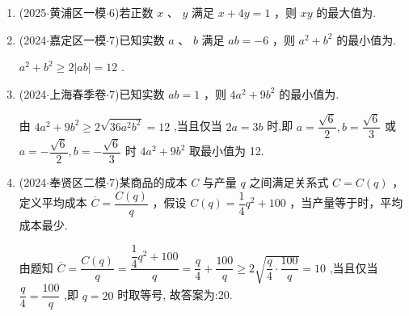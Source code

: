 \begin{enumerate}
    \item (2025$\cdot$黄浦区一模$\cdot$6)若正数 $x$ 、 $y$ 满足 $x + {4y} = 1$ ，则 ${xy}$ 的最大值为.
    \begin{jieda}
    \end{jieda}

    \item (2024$\cdot$嘉定区一模$\cdot$7)已知实数 $a$ 、 $b$ 满足 ${ab} =  - 6$ ，则 ${a}^{2} + {b}^{2}$ 的最小值为.
    \begin{jieda}
        ${a}^{2} + {b}^{2} \geq  2\left| {ab}\right|  = {12}$ .
    \end{jieda}

    \item (2024$\cdot$上海春季卷$\cdot$7)已知实数 ${ab} = 1$ ，则 $4{a}^{2} + 9{b}^{2}$ 的最小值为.
    \begin{jieda}
        由 $4{a}^{2} + 9{b}^{2} \geq  2\sqrt{{36}{a}^{2}{b}^{2}} = {12}$ ,当且仅当 ${2a} = {3b}$ 时,即 $a = \dfrac{\sqrt{6}}{2},b = \dfrac{\sqrt{6}}{3}$ 或 $a =  - \dfrac{\sqrt{6}}{2},b =  -\dfrac{\sqrt{6}}{3}$ 时 $4{a}^{2} +  9{b}^{2}$ 取最小值为 12.
    \end{jieda}

    \item (2024$\cdot$奉贤区二模$\cdot$7)某商品的成本 $C$ 与产量 $q$ 之间满足关系式 $C = C\left( q\right)$ ，定义平均成本 $\overline{C} = \dfrac{C\left( q\right) }{q}$ ，假设 $C\left( q\right)  = \dfrac{1}{4}{q}^{2} + {100}$ ，当产量等于时，平均成本最少.    
    \begin{jieda}
        由题知 $\overline{C} = \dfrac{C\left( q\right) }{q} = \dfrac{\dfrac{1}{4}{q}^{2} + {100}}{q} = \dfrac{q}{4} + \dfrac{100}{q} \geq  2\sqrt{\dfrac{q}{4} \cdot  \dfrac{100}{q}} = {10}$ ,当且仅当 $\dfrac{q}{4} = \dfrac{100}{q}$ ,即 $q = {20}$ 时取等号, 故答案为:20.
    \end{jieda}


\end{enumerate}
